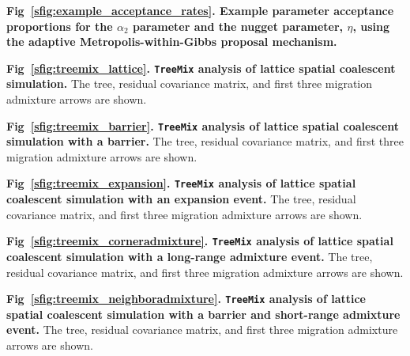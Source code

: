 \documentclass[10pt,letterpaper]{article}
\begin{document}
\label{example_acceptance_rates}
{\bf{Fig\ \ref{sfig:example_acceptance_rates}. Example parameter acceptance proportions for the $\alpha_2$ parameter and the nugget parameter, $\eta$, using the adaptive Metropolis-within-Gibbs proposal mechanism.}}

\label{treemix_lattice}
{\bf{Fig\ \ref{sfig:treemix_lattice}. \texttt{TreeMix} analysis of lattice spatial coalescent simulation.}}  
The tree, residual covariance matrix, and first three migration admixture arrows are shown.

\label{treemix_barrier}
{\bf{Fig\ \ref{sfig:treemix_barrier}. \texttt{TreeMix} analysis of lattice spatial coalescent simulation with a barrier.}}
The tree, residual covariance matrix, and first three migration admixture arrows are shown.

\label{treemix_expansion}
{\bf{Fig\ \ref{sfig:treemix_expansion}. \texttt{TreeMix} analysis of lattice spatial coalescent simulation with an expansion event.}}
The tree, residual covariance matrix, and first three migration admixture arrows are shown.

\label{treemix_corneradmixture}
{\bf{Fig\ \ref{sfig:treemix_corneradmixture}. \texttt{TreeMix} analysis of lattice spatial coalescent simulation with a long-range admixture event.}}
The tree, residual covariance matrix, and first three migration admixture arrows are shown.

\label{treemix_neighboradmixture}
{\bf{Fig\ \ref{sfig:treemix_neighboradmixture}. \texttt{TreeMix} analysis of lattice spatial coalescent simulation with a barrier and short-range admixture event.}}  
The tree, residual covariance matrix, and first three migration admixture arrows are shown.
\end{document}
